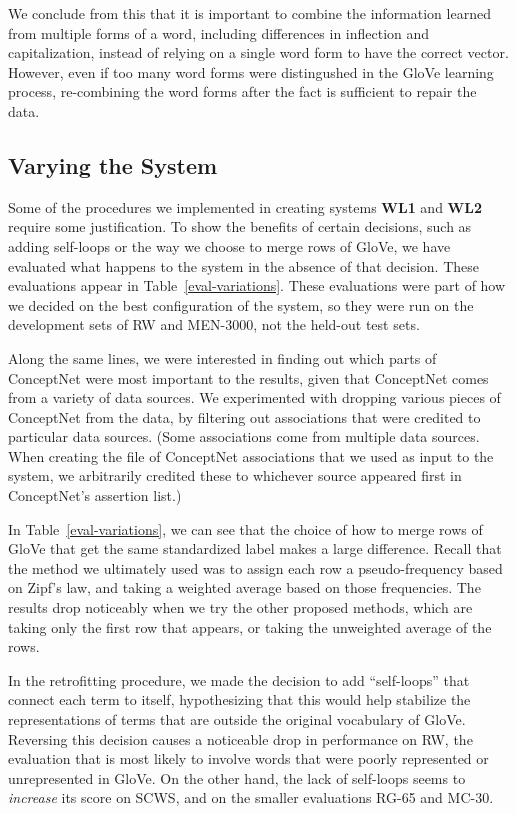 \documentclass[letterpaper]{article}
\begin{document}
We conclude from this that it is important to combine the information learned
from multiple forms of a word, including differences in inflection and
capitalization, instead of relying on a single word form to have the correct
vector. However, even if too many word forms were distingushed in the GloVe
learning process, re-combining the word forms after the fact is sufficient to
repair the data.

\subsection{Varying the System}

Some of the procedures we implemented in creating systems {\bf WL1} and
{\bf WL2} require some justification. To show the benefits of certain decisions,
such as adding self-loops or the way we choose to merge rows of GloVe, we have
evaluated what happens to the system in the absence of that decision. These
evaluations appear in Table~\ref{eval-variations}. These evaluations were
part of how we decided on the best configuration of the system, so they were
run on the development sets of RW and MEN-3000, not the held-out test sets.

Along the same lines, we were interested in finding out which parts of
ConceptNet were most important to the results, given that ConceptNet comes from
a variety of data sources. We experimented with dropping various pieces of
ConceptNet from the data, by filtering out associations that were credited to
particular data sources. (Some associations come from multiple data sources.
When creating the file of ConceptNet associations that we used as input to the
system, we arbitrarily credited these to whichever source appeared first in
ConceptNet's assertion list.)

In Table~\ref{eval-variations}, we can see that the choice of how to merge
rows of GloVe that get the same standardized label makes a large difference.
Recall that the method we ultimately used was to assign each row a
pseudo-frequency based on Zipf's law, and taking a weighted average based on
those frequencies. The results drop noticeably when we try the other proposed
methods, which are taking only the first row that appears, or taking the
unweighted average of the rows.

In the retrofitting procedure, we made the decision to add ``self-loops'' that
connect each term to itself, hypothesizing that this would help stabilize the
representations of terms that are outside the original vocabulary of GloVe.
Reversing this decision causes a noticeable drop in performance on RW, the
evaluation that is most likely to involve words that were poorly represented or
unrepresented in GloVe. On the other hand, the lack of self-loops seems to {\em
increase} its score on SCWS, and on the smaller evaluations RG-65 and MC-30.
\end{document}
